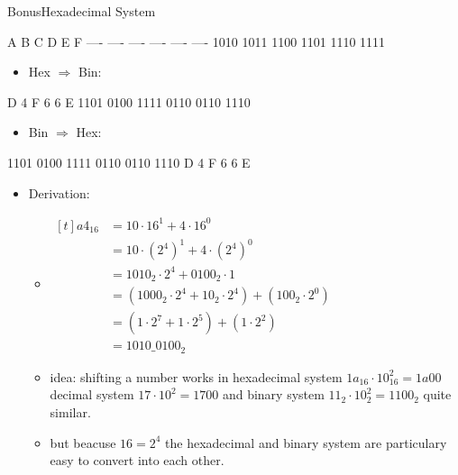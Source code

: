 \begin{frame}{Bonus}{Hexadecimal System\vspace{0.5cm}}
\begin{terminal}
  A    B    C    D    E    F
  ---- ---- ---- ---- ---- ----
  1010 1011 1100 1101 1110 1111
  \end{terminal}
  \framebreak
  \begin{itemize}
    \item \alert{Hex $\Rightarrow$ Bin:}
  \end{itemize}
  \begin{terminal}
     D    4    F    6    6    E
  1101 0100 1111 0110 0110 1110
  \end{terminal}
  \begin{itemize}
    \item \alert{Bin $\Rightarrow$ Hex:}
  \end{itemize}
  \begin{terminal}
  1101 0100 1111 0110 0110 1110
     D    4    F    6    6    E
  \end{terminal}
  \framebreak
  \begin{itemize}
    \item \alert{Derivation:}
    \begin{itemize}
      \item $\begin{aligned}[t]
          a4_{16} &= 10 \cdot 16^1 + 4 \cdot 16^0 \\
                  &= 10 \cdot {(2^4)}^1 + 4 \cdot {(2^4)}^0 \\
                  &= 1010_2 \cdot 2^4 + 0100_2 \cdot 1 \\
                  &= (1000_2 \cdot 2^4 + 10_2 \cdot 2^4) + (100_2 \cdot 2^0) \\
                  &= (1 \cdot 2^7 + 1 \cdot 2^5) + (1 \cdot 2^2) \\
                  &= 1010\_0100_{2}
        \end{aligned}$
      \item \alert{idea:} shifting a number works in hexadecimal system $1a_{16} \cdot 10^2_{16} = 1a00$ decimal system $17 \cdot 10^2 = 1700$ and binary system $11_2 \cdot 10_2^2 = 1100_2$ quite similar.
      \item but beacuse $16 = 2^4$ the \alert{hexadecimal} and \alert{binary system} are particulary easy to convert into each other.
    \end{itemize}
  \end{itemize}
\end{frame}

